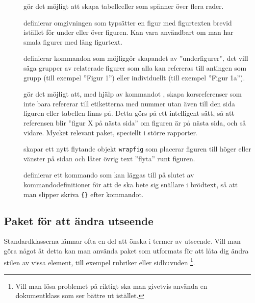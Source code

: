 \documentclass[10pt,../../a4.tex]{subfiles}
\begin{document}
\begin{description}
	\item[]
	gör det möjligt att skapa tabellceller som spänner över flera
	rader.
	
	\item[]
	definierar omgivningen  som typsätter en figur med
	figurtexten brevid istället för under eller över figuren. Kan vara
	användbart om man har smala figurer med lång figurtext.
	
	\item[]
	definierar kommandon som möjliggör skapandet av ”underfigurer”, det
	vill säga grupper av relaterade figurer som alla kan refereras till
	antingen som grupp (till exempel ”Figur 1”) eller individuellt (till
	exempel ”Figur 1a”).
	
	\item[]
	gör det möjligt att, med hjälp av kommandot ,
	skapa korsreferenser
	som inte bara refererar till etiketterna med nummer utan även till den
	sida figuren eller tabellen finns på. Detta görs på ett intelligent
	sätt, så att referensen blir ”figur X på nästa sida” om figuren är på
	nästa sida, och så vidare. Mycket relevant paket, speciellt i större
	rapporter.
	
	\item[]
	skapar ett nytt flytande objekt \texttt{wrapfig} som placerar figuren
	till höger eller vänster på sidan och låter övrig text ”flyta” runt
	figuren.
	
	\item[]
	definierar ett kommando  som kan läggas till på slutet av
	kommandodefinitioner för att de ska bete sig snällare i brödtext, så
	att man slipper skriva \texttt{\{\}} efter kommandot.
\end{description}

\subsection{Paket för att ändra utseende}
Standardklasserna lämnar ofta en del att önska i termer av utseende. Vill
man göra något åt detta kan man använda paket som utformats för att låta
dig ändra stilen av vissa element, till exempel rubriker eller sidhuvuden%
\footnote{Vill man lösa problemet på riktigt ska man givetvis använda en
dokumentklass som ser bättre ut istället.}.
\end{document}

